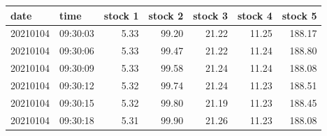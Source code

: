 \begin{tabular}{llrrrrr}
\toprule
date & time & stock 1 & stock 2 & stock 3 & stock 4 & stock 5 \\
\midrule
20210104 & 09:30:03 & 5.33 & 99.20 & 21.22 & 11.25 & 188.17 \\
20210104 & 09:30:06 & 5.33 & 99.47 & 21.22 & 11.24 & 188.80 \\
20210104 & 09:30:09 & 5.33 & 99.58 & 21.24 & 11.24 & 188.08 \\
20210104 & 09:30:12 & 5.32 & 99.74 & 21.24 & 11.23 & 188.51 \\
20210104 & 09:30:15 & 5.32 & 99.80 & 21.19 & 11.23 & 188.45 \\
20210104 & 09:30:18 & 5.31 & 99.90 & 21.26 & 11.23 & 188.08 \\
\bottomrule
\end{tabular}
